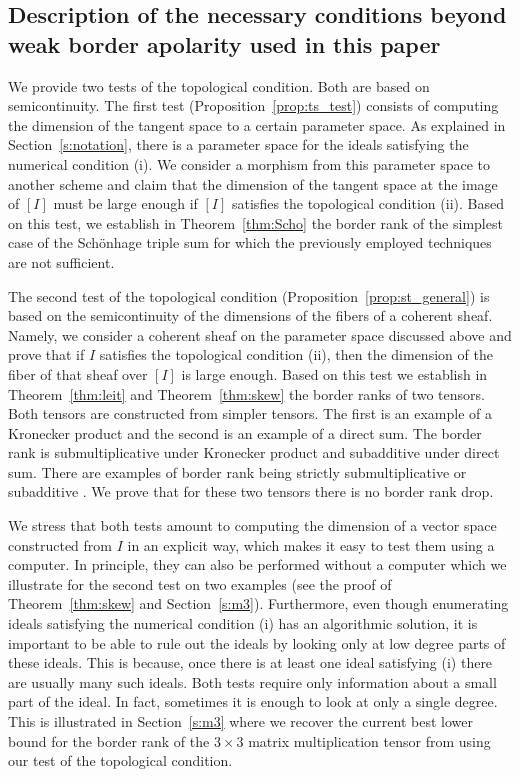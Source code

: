 \documentclass[12pt]{amsart}
\theoremstyle{definition}
\theoremstyle{remark}
\theoremstyle{definition}
\begin{document}
\subsection{Description of the necessary conditions beyond weak border apolarity used in this paper}

We provide two tests of the topological condition. Both are  based on semicontinuity. The first test (Proposition~\ref{prop:ts_test}) consists of computing the dimension of the tangent space to a certain parameter space. As explained in Section~\ref{s:notation}, there is a parameter space for the ideals satisfying the numerical condition (i). We consider a morphism from this parameter space to another scheme and claim that the dimension of the tangent space at the image of $[I]$ must be large enough if $[I]$ satisfies the topological condition (ii). Based on this test, we establish in Theorem~\ref{thm:Scho} the border rank of the simplest case of the Sch\"onhage triple sum for which the previously employed techniques are not sufficient.

The second test of the topological condition (Proposition~\ref{prop:st_general}) is based on the semicontinuity of the dimensions of the fibers of a coherent sheaf. Namely, we consider a coherent sheaf on the parameter space discussed above and prove that if $I$ satisfies the topological condition (ii), then the dimension of the fiber of that sheaf over $[I]$ is large enough. Based on this test we establish in Theorem~\ref{thm:leit} and Theorem~\ref{thm:skew} the border ranks of two tensors. Both tensors are constructed from simpler tensors. The first is an example of a Kronecker product and the second is an example of a direct sum. The border rank is submultiplicative under Kronecker product and subadditive under direct sum. There are examples of border rank being strictly submultiplicative \cite{CGJ19} or subadditive \cite{Sch81}. We prove that for these two tensors there is no border rank drop.

We stress that both tests amount to   computing the dimension of a vector space constructed from $I$ in an explicit way, which makes it easy to test them using a computer. In principle, they can also be performed without a computer which we illustrate for the second test on two examples (see the proof of Theorem~\ref{thm:skew} and Section~\ref{s:m3}). Furthermore, even though enumerating ideals satisfying the numerical condition (i) has an algorithmic solution, it is important to be able to rule out the ideals by looking only at low degree parts of these ideals. This is because, once there is at least one ideal satisfying (i) there are
usually many such ideals. Both tests require only information about a small part of the ideal. In fact, sometimes it is enough to look at only a single degree. This is illustrated  in Section~\ref{s:m3} where we recover the current best lower bound for the border rank of the $3\times 3$ matrix multiplication tensor from \cite{chl19} using our test of the topological condition.
\end{document}

